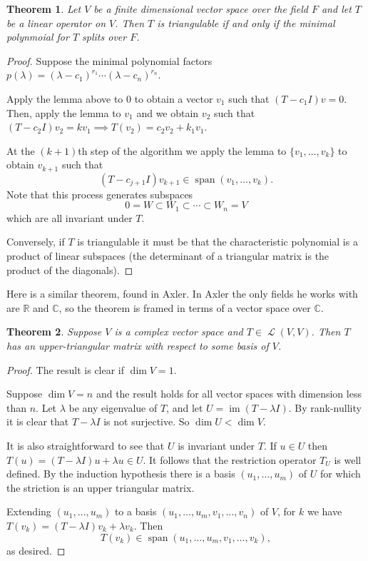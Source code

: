\documentclass[12pt]{article}
\theoremstyle{plain}
\newtheorem{thm}{Theorem}
\theoremstyle{definition}
\newcommand{\Lop}{\operatorname{\mathcal{L}}}
\newcommand{\im}{\operatorname{im}}
\newcommand{\Span}{\operatorname{span}}
\begin{document}
\begin{thm}
Let $V$ be a finite dimensional vector space over the field $F$ and let $T$ be a linear operator on $V$. Then $T$ is triangulable if and only if the minimal polynmoial for $T$ splits over $F$.
\end{thm}
\begin{proof}
Suppose the minimal polynomial factors $p(\lambda) = (\lambda - c_1)^{r_1}\cdots(\lambda - c_n)^{r_n}$.

Apply the lemma above to ${0}$ to obtain a vector $v_1$ such that $(T - c_1I)v = 0$. Then, apply the lemma to ${v_1}$ and we obtain $v_2$ such that $(T - c_2I)v_2 = kv_1 \implies T(v_2) = c_2v_2 + k_1v_1$.

At the $(k + 1)$th step of the algorithm we apply the lemma to $\{v_1, \dotsc, v_k\}$ to obtain $v_{k + 1}$ such that 
\[(T - c_{j + 1}I)v_{k + 1} \in \Span(v_1, \dotsc, v_k).\]
Note that this process generates subspaces 
\[0 = W \subset W_1 \subset \cdots \subset W_n = V\] which are all invariant under $T$.

Conversely, if $T$ is triangulable it must be that the characteristic polynomial is a product of linear subspaces (the determinant of a triangular matrix is the product of the diagonals).
\end{proof}

Here is a similar theorem, found in Axler. In Axler the only fields he works with are $\mathbb{R}$ and $\mathbb{C}$, so the theorem is framed in terms of a vector space over $\mathbb{C}$.

\begin{thm}
Suppose $V$ is a complex vector space and $T \in \Lop(V, V)$. Then $T$ has an upper-triangular matrix with respect to some basis of $V$.
\end{thm}
\begin{proof}
The result is clear if $\dim{V} = 1$.

Suppose $\dim{V} = n$ and the result holds for all vector spaces with dimension less than $n$. Let $\lambda$ be any eigenvalue of $T$, and let $U = \im(T - \lambda I)$. By rank-nullity it is clear that $T - \lambda I$ is not surjective. So $\dim{U} < \dim{V}$.

It is also straightforward to see that $U$ is invariant under $T$. If $u \in U$ then $T(u) = (T - \lambda I)u + \lambda u \in U$. It follows that the restriction operator $T_U$ is well defined. By the induction hypothesis there is a basis $(u_1, \dotsc, u_m)$ of $U$ for which the striction is an upper triangular matrix.

Extending $(u_1, \dotsc, u_m)$ to a basis $(u_1, \dotsc, u_m, v_1, \dotsc, v_n)$ of $V$, for $k$ we have $T(v_k) = (T - \lambda I)v_k + \lambda v_k$. Then
\[T(v_k) \in \Span(u_1, \dotsc, u_m, v_1, \dotsc, v_k),\] as desired.
\end{proof}
\end{document}
